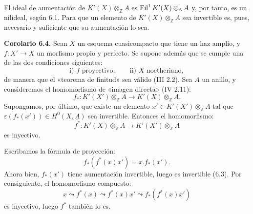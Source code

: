 El ideal de aumentación de $K'(X)\otimes_{\mathbb Z}A$ es $\operatorname{Fil}^1K'(X)\otimes_{\mathbb Z}A$ y, por tanto, es un nilideal, según 6.1. Para que un elemento de $K'(X)\otimes_{\mathbb Z}A$ sea invertible es, pues, necesario y suficiente que su aumentación lo sea.

\textbf{Corolario 6.4.} Sean $X$ un esquema cuasicompacto que tiene un haz amplio, y $f:X'\to X$ un morfismo propio y perfecto. Se supone además que se cumple una de las dos condiciones siguientes:
\[
  \text{i) } f\text{ proyectivo},\qquad
  \text{ii) } X\text{ noetheriano},
\]
de manera que el «teorema de finitud» sea válido (III 2.2). Sea $A$ un anillo, y consideremos el homomorfismo de «imagen directa» (IV 2.11):
\[
  f_*:K'(X')\otimes_{\mathbb Z}A\longrightarrow K'(X)\otimes_{\mathbb Z}A.
\]
Supongamos, por último, que existe un elemento $x'\in K'(X')\otimes_{\mathbb Z}A$ tal que $\varepsilon(f_*(x'))\in H^0(X,\underline A)$ sea invertible. Entonces el homomorfismo:
\[
  f^*:K'(X)\otimes_{\mathbb Z}A\longrightarrow K'(X')\otimes_{\mathbb Z}A
\]
es inyectivo.

Escribamos la fórmula de proyección:
\[
  f_*(f^*(x)x')=x.f_*(x').
\]
Ahora bien, $f_*(x')$ tiene aumentación invertible, luego es invertible (6.3). Por consiguiente, el homomorfismo compuesto:
\[
  x\leadsto f^*(x)\leadsto f^*(x)x'\leadsto f_*(f^*(x)x')
\]
es inyectivo, luego $f^*$ también lo es.
